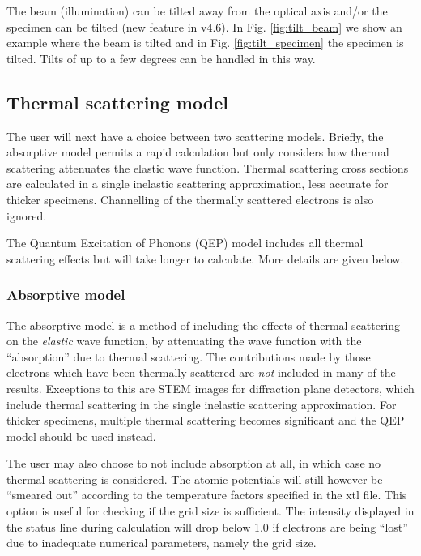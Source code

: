 \documentclass[12pt,a4paper]{article}
\begin{document}
The beam (illumination) can be tilted away from the optical axis and/or the specimen can be tilted (new feature in v4.6). In Fig. \ref{fig:tilt_beam} we show an example where the beam is tilted and in Fig. \ref{fig:tilt_specimen} the specimen is tilted. Tilts of up to a few degrees can be handled in this way.



\subsection{Thermal scattering model}

The user will next have a choice between two scattering models.
Briefly, the absorptive model permits a rapid calculation but only considers how thermal scattering attenuates the elastic wave function.
Thermal scattering cross sections are calculated in a single inelastic scattering approximation, less accurate for thicker specimens.
Channelling of the thermally scattered electrons is also ignored.

The Quantum Excitation of Phonons (QEP) model includes all thermal scattering effects but will take longer to calculate.
More details are given below.

\subsubsection{Absorptive model}
\label{sec:absorptive}

The absorptive model is a method of including the effects of thermal scattering on the \emph{elastic} wave function, by attenuating the wave function with the ``absorption'' due to thermal scattering.
The contributions made by those electrons which have been thermally scattered are \emph{not} included in many of the results.
Exceptions to this are STEM images for diffraction plane detectors, which include thermal scattering in the single inelastic scattering approximation.
For thicker specimens, multiple thermal scattering becomes significant and the QEP model should be used instead.

The user may also choose to not include absorption at all, in which case no thermal scattering is considered.
The atomic potentials will still however be ``smeared out'' according to the temperature factors specified in the xtl file.
This option is useful for checking if the grid size is sufficient.
The intensity displayed in the status line during calculation will drop below 1.0 if electrons are being ``lost'' due to inadequate numerical parameters, namely the grid size.
\end{document}
